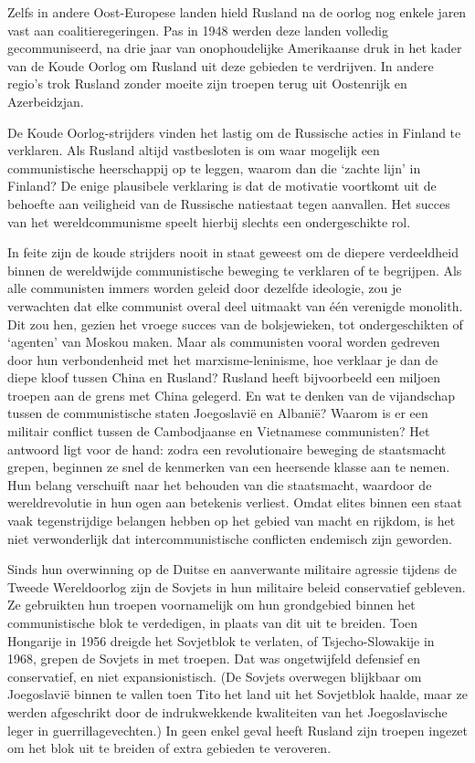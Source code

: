 \documentclass[
  a5paper,
  smalldemyvopaper,10pt,twoside,onecolumn,openright,extrafontsizes,hidelinks]{memoir}
\begin{document}
Zelfs in andere Oost-Europese landen hield Rusland na de oorlog nog
enkele jaren vast aan coalitieregeringen. Pas in 1948 werden deze landen
volledig gecommuniseerd, na drie jaar van onophoudelijke Amerikaanse
druk in het kader van de Koude Oorlog om Rusland uit deze gebieden te
verdrijven. In andere regio's trok Rusland zonder moeite zijn troepen
terug uit Oostenrijk en Azerbeidzjan.

De Koude Oorlog-strijders vinden het lastig om de Russische acties in
Finland te verklaren. Als Rusland altijd vastbesloten is om waar
mogelijk een communistische heerschappij op te leggen, waarom dan die
`zachte lijn' in Finland? De enige plausibele verklaring is dat de
motivatie voortkomt uit de behoefte aan veiligheid van de Russische
natiestaat tegen aanvallen. Het succes van het wereldcommunisme speelt
hierbij slechts een ondergeschikte rol.

In feite zijn de koude strijders nooit in staat geweest om de diepere
verdeeldheid binnen de wereldwijde communistische beweging te verklaren
of te begrijpen. Als alle communisten immers worden geleid door dezelfde
ideologie, zou je verwachten dat elke communist overal deel uitmaakt van
één verenigde monolith. Dit zou hen, gezien het vroege succes van de
bolsjewieken, tot ondergeschikten of `agenten' van Moskou maken. Maar
als communisten vooral worden gedreven door hun verbondenheid met het
marxisme-leninisme, hoe verklaar je dan de diepe kloof tussen China en
Rusland? Rusland heeft bijvoorbeeld een miljoen troepen aan de grens met
China gelegerd. En wat te denken van de vijandschap tussen de
communistische staten Joegoslavië en Albanië? Waarom is er een militair
conflict tussen de Cambodjaanse en Vietnamese communisten? Het antwoord
ligt voor de hand: zodra een revolutionaire beweging de staatsmacht
grepen, beginnen ze snel de kenmerken van een heersende klasse aan te
nemen. Hun belang verschuift naar het behouden van die staatsmacht,
waardoor de wereldrevolutie in hun ogen aan betekenis verliest. Omdat
elites binnen een staat vaak tegenstrijdige belangen hebben op het
gebied van macht en rijkdom, is het niet verwonderlijk dat
intercommunistische conflicten endemisch zijn geworden.

Sinds hun overwinning op de Duitse en aanverwante militaire agressie
tijdens de Tweede Wereldoorlog zijn de Sovjets in hun militaire beleid
conservatief gebleven. Ze gebruikten hun troepen voornamelijk om hun
grondgebied binnen het communistische blok te verdedigen, in plaats van
dit uit te breiden. Toen Hongarije in 1956 dreigde het Sovjetblok te
verlaten, of Tsjecho-Slowakije in 1968, grepen de Sovjets in met
troepen. Dat was ongetwijfeld defensief en conservatief, en niet
expansionistisch. (De Sovjets overwegen blijkbaar om Joegoslavië binnen
te vallen toen Tito het land uit het Sovjetblok haalde, maar ze werden
afgeschrikt door de indrukwekkende kwaliteiten van het Joegoslavische
leger in guerrillagevechten.) In geen enkel geval heeft Rusland zijn
troepen ingezet om het blok uit te breiden of extra gebieden te
veroveren.
\end{document}
